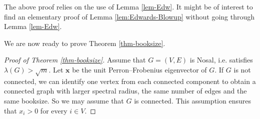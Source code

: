 \documentclass[11pt,a4paper]{article}
\theoremstyle{definition}
\theoremstyle{remark}
\begin{document}
The above proof relies on the use of Lemma \ref{lem-Edw}. 
It might be of interest to find an elementary proof of 
Lemma \ref{lem:Edwards-Blowup} without going through Lemma \ref{lem-Edw}. 

We are now ready to prove Theorem \ref{thm-booksize}. 

\begin{proof}[Proof of Theorem \ref{thm-booksize}]
Assume that $G=(V,E)$ is Nosal, i.e. satisfies $\lambda(G) > \sqrt{m}$. Let $\bm{x}$ be the unit Perron--Frobenius eigenvector of $G$. If $G$ is not connected, we can identify one vertex from each connected component to obtain a connected graph with larger spectral radius, the same number of edges and the same booksize. So we may assume that $G$ is connected. This assumption ensures that $x_i > 0$ for every $i\in V$.  


\end{proof}
\end{document}
